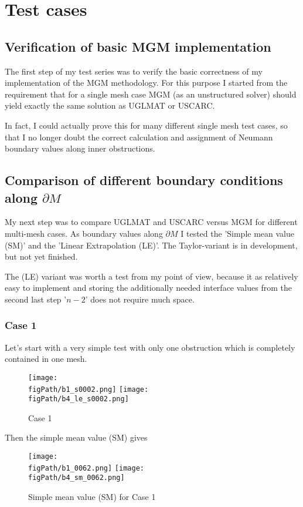 
\section{Test cases}

\subsection{Verification of basic MGM implementation}
The first step of my test series was to verify the basic correctness of my implementation of the MGM methodology. For this purpose I started from the requirement that for a single mesh case MGM (as an unstructured solver) should yield exactly the same solution as UGLMAT or USCARC.

In fact, I could actually prove this for many different single mesh test cases, so that I no longer doubt the correct calculation and assignment of Neumann boundary values along inner obstructions.



\subsection{Comparison of different boundary conditions along $\partial M$}
My next step was to compare UGLMAT and USCARC versus MGM for different multi-mesh cases. 
As boundary values along $\partial M$ I tested the 'Simple mean value (SM)' and the 'Linear Extrapolation (LE)'. The Taylor-variant is in development, but not yet finished.

The (LE) variant was worth a test from my point of view, because it as relatively easy to implement and storing the additionally needed interface values from the second last step '${n-2}$' does not require much space. 

\subsubsection{Case 1}
Let's start with a very simple test with only one obstruction which is completely contained in one mesh. 
\begin{figure}[H]
\begin{center}
\texttt{[image: \\figPath/b1\_s0002.png]}
\texttt{[image: \\figPath/b4\_le\_s0002.png]}
\end{center}
\caption{Case 1}
\label{FIG_MGM_Grid}
\end{figure}
\newpage
Then the simple mean value (SM) gives

\begin{figure}[H]
\begin{center}
\texttt{[image: \\figPath/b1\_0062.png]}
\texttt{[image: \\figPath/b4\_sm\_0062.png]}
\end{center}
\caption{Simple mean value  (SM) for Case 1}
\label{FIG_MGM_Grid}
\end{figure}


